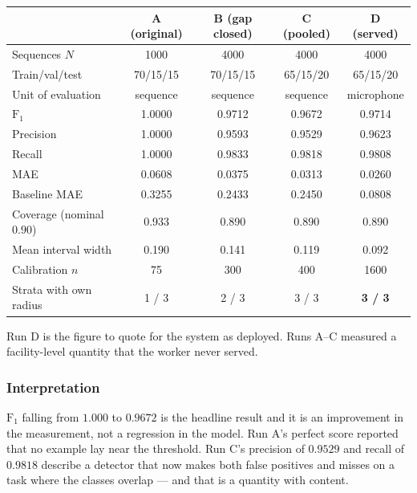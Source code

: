 \documentclass[11pt]{article}
\begin{document}
\begin{center}
\begin{tabular}{lcccc}
\toprule
& \textbf{A} (original) & \textbf{B} (gap closed) & \textbf{C} (pooled) & \textbf{D} (served) \\
\midrule
Sequences $N$              & 1000   & 4000   & 4000   & 4000 \\
Train/val/test             & 70/15/15 & 70/15/15 & 65/15/20 & 65/15/20 \\
Unit of evaluation         & sequence & sequence & sequence & microphone \\
\midrule
$\mathrm{F}_1$             & 1.0000 & 0.9712 & 0.9672 & 0.9714 \\
Precision                  & 1.0000 & 0.9593 & 0.9529 & 0.9623 \\
Recall                     & 1.0000 & 0.9833 & 0.9818 & 0.9808 \\
MAE                        & 0.0608 & 0.0375 & 0.0313 & 0.0260 \\
Baseline MAE               & 0.3255 & 0.2433 & 0.2450 & 0.0808 \\
\midrule
Coverage (nominal $0.90$)  & 0.933  & 0.890  & 0.890  & 0.890 \\
Mean interval width        & 0.190  & 0.141  & 0.119  & 0.092 \\
Calibration $n$            & 75     & 300    & 400    & 1600 \\
Strata with own radius     & 1 / 3  & 2 / 3  & 3 / 3  & \textbf{3 / 3} \\
\bottomrule
\end{tabular}
\end{center}

Run D is the figure to quote for the system as deployed. Runs A--C measured a
facility-level quantity that the worker never served.

\subsubsection{Interpretation}

$\mathrm{F}_1$ falling from $1.000$ to $0.9672$ is the headline result and it is
an improvement in the measurement, not a regression in the model. Run A's
perfect score reported that no example lay near the threshold. Run C's precision
of $0.9529$ and recall of $0.9818$ describe a detector that now makes both false
positives and misses on a task where the classes overlap --- and that is a
quantity with content.
\end{document}
